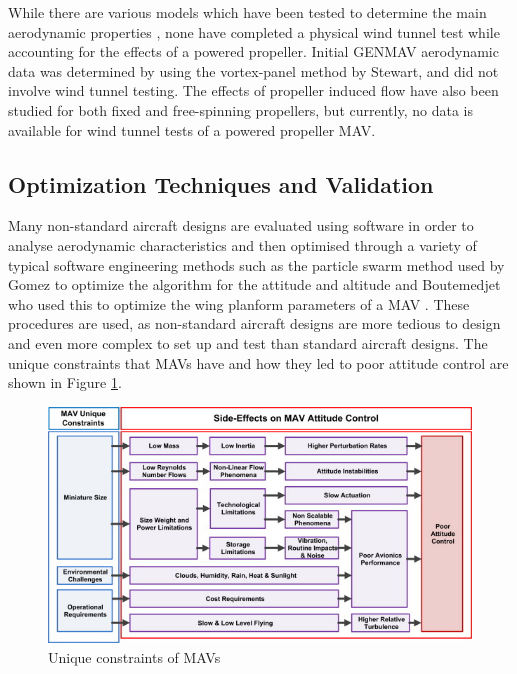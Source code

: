 While there are various models which have been tested to determine the main aerodynamic properties \cite{Stewart2007} \cite{Aboelezz2020}, none have completed a physical wind tunnel test while accounting for the effects of a powered propeller. Initial GENMAV aerodynamic data was determined by using the vortex-panel method by Stewart\cite{Stewart2007}, and did not involve wind tunnel testing. The effects of propeller induced flow have also been studied for both fixed and free-spinning propellers, but currently, no data is available for wind tunnel tests of a powered propeller MAV.

\subsection{Optimization Techniques and Validation}
\label{subsec:Optimization}
Many non-standard aircraft designs are evaluated using software in order to analyse aerodynamic characteristics and then optimised through a variety of typical software engineering methods such as the particle swarm method used by Gomez to optimize the algorithm for the attitude and altitude and Boutemedjet who used this to optimize the wing planform parameters of a MAV \cite{Gomez2020} \cite{Boutemedjet2019}. These procedures are used, as non-standard aircraft designs are more tedious to design and even more complex to set up and test than standard aircraft designs. The unique constraints that MAVs have and how they led to poor attitude control are shown in Figure \ref{fig:MAVconstrain}.

\begin{figure}[H]
  \centering
   \includegraphics[width=\linewidth]{03_LiteratureReview/Figs/fowchart.jpg}
  \caption{Unique constraints of MAVs \cite{Mohamed2014}}
  \label{fig:MAVconstrain}
\end{figure}

